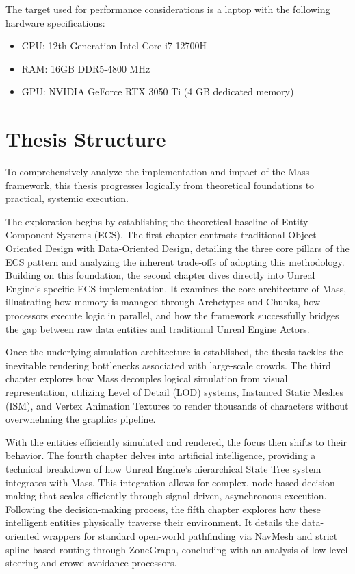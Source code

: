 The target used for performance considerations is a laptop with the following hardware specifications:
\begin{itemize}
    \item CPU: 12th Generation Intel Core i7-12700H
    \item RAM: 16GB DDR5-4800 MHz
    \item GPU: NVIDIA GeForce RTX 3050 Ti (4 GB dedicated memory)
\end{itemize}

\section[Thesis Structure]{Thesis Structure} %

To comprehensively analyze the implementation and impact of the Mass framework, this thesis progresses logically from theoretical foundations to practical, systemic execution.

The exploration begins by establishing the theoretical baseline of Entity Component Systems (ECS). The first chapter contrasts traditional Object-Oriented Design with Data-Oriented Design, detailing the three core pillars of the ECS pattern and analyzing the inherent trade-offs of adopting this methodology. Building on this foundation, the second chapter dives directly into Unreal Engine's specific ECS implementation. It examines the core architecture of Mass, illustrating how memory is managed through Archetypes and Chunks, how processors execute logic in parallel, and how the framework successfully bridges the gap between raw data entities and traditional Unreal Engine Actors.

Once the underlying simulation architecture is established, the thesis tackles the inevitable rendering bottlenecks associated with large-scale crowds. The third chapter explores how Mass decouples logical simulation from visual representation, utilizing Level of Detail (LOD) systems, Instanced Static Meshes (ISM), and Vertex Animation Textures to render thousands of characters without overwhelming the graphics pipeline.

With the entities efficiently simulated and rendered, the focus then shifts to their behavior. The fourth chapter delves into artificial intelligence, providing a technical breakdown of how Unreal Engine's hierarchical State Tree system integrates with Mass. This integration allows for complex, node-based decision-making that scales efficiently through signal-driven, asynchronous execution. Following the decision-making process, the fifth chapter explores how these intelligent entities physically traverse their environment. It details the data-oriented wrappers for standard open-world pathfinding via NavMesh and strict spline-based routing through ZoneGraph, concluding with an analysis of low-level steering and crowd avoidance processors.

